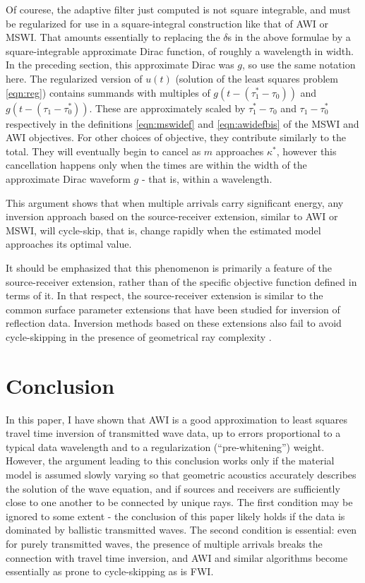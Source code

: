 Of courese, the adaptive filter just computed is not square
integrable, and must be regularized for use in a square-integral
construction like that of AWI or MSWI. That amounts essentially to
replacing the $\delta$s in the above formulae by a square-integrable
approximate Dirac function, of roughly a wavelength in width. In the
preceding section, this approximate Dirac was $g$, so use the same
notation here. The regularized version of $u(t)$ (solution of the
least squares problem \ref{eqn:reg}) contains summands with multiples of $g(t-(\tau^*_1-\tau_0))$
and $g(t-(\tau_1-\tau^*_0))$. These are approximately scaled by
$\tau^*_1-\tau_0$ and $\tau_1-\tau^*_0$ respectively in the
definitions \ref{eqn:mswidef} and \ref{eqn:awidefbis} of the MSWI and AWI
objectives. For other choices of objective, they contribute similarly
to the total. They will eventually begin to cancel as $m$ approaches
$\kappa^*$, however this cancellation happens only when the times are
within the width of the approximate 
Dirac waveform $g$ - that is, within a wavelength.

This argument shows that when multiple arrivals carry significant energy, any
inversion approach based on the source-receiver extension, similar to
AWI or MSWI, will cycle-skip, that is, change rapidly when the
estimated model approaches its optimal value.

It should be emphasized that this phenomenon is primarily a feature of the
source-receiver extension, rather than of the specific objective
function defined in terms of it. In that respect, the source-receiver
extension is similar to the common surface parameter extensions that
have been studied for inversion of reflection data. Inversion methods
based on these extensions also fail to avoid cycle-skipping in the presence of
geometrical ray complexity \cite[]{geoprosp:2008}.

\section{Conclusion}
In this paper, I have shown that AWI is a good approximation to least
squares travel time inversion of transmitted wave data, up to errors proportional to a typical
data wavelength and to a regularization (``pre-whitening'')
weight. However, the argument leading to this conclusion works only if
the material model is assumed slowly varying so that geometric
acoustics accurately describes the solution of the wave equation, and if
sources and receivers are sufficiently close to one another to be
connected by unique rays. The first condition may be ignored to some
extent - the conclusion of this paper likely holds if the data is
dominated by ballistic transmitted waves. The second condition
is essential: even for purely transmitted waves, the presence of
multiple arrivals breaks the connection
with travel time inversion, and AWI and similar algorithms
become essentially as prone to cycle-skipping as is FWI.

